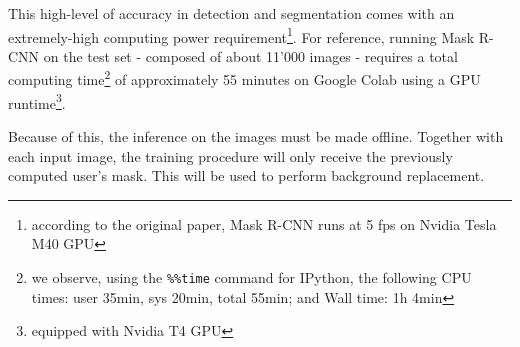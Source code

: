 This high-level of accuracy in detection and segmentation comes with an extremely-high computing power requirement\footnote{according to the original paper, Mask R-CNN runs at 5 \gls{fps} on Nvidia Tesla M40 GPU}. For reference, running Mask R-CNN on the test set - composed of about 11'000 images - requires a total computing time\footnote{we observe, using the \texttt{\%\%time} command for IPython, the following CPU times: user 35min, sys 20min, total 55min; and Wall time: 1h 4min} of approximately 55 minutes on Google Colab using a GPU runtime\footnote{equipped with Nvidia T4 GPU}.

Because of this, the inference on the images must be made offline. Together with each input image, the training procedure will only receive the previously computed user's mask. This will be used to perform background replacement.

